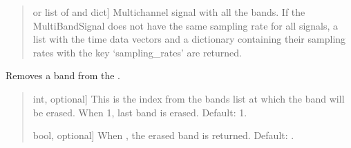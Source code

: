 \documentclass[letterpaper,10pt,english]{sphinxmanual}
\begin{document}
\begin{fulllineitems}
\begin{fulllineitems}
\begin{quote}
\begin{description}
\begin{description}
\end{description}

\begin{description}
\sphinxlineitem{\sphinxstylestrong{sig}}{[} or list of  and dict{]}
\sphinxAtStartPar
Multichannel signal with all the bands. If the MultiBandSignal
does not have the same sampling rate for all signals, a list with
the time data vectors and a dictionary containing their sampling
rates with the key ‘sampling\_rates’ are returned.

\end{description}

\end{description}\end{quote}

\end{fulllineitems}


\begin{fulllineitems}
\label{\detokenize{classes:dsptoolbox.classes.multibandsignal.MultiBandSignal.remove_band}}
\pysigstartsignatures
{}
\pysigstopsignatures
\sphinxAtStartPar
Removes a band from the .
\begin{quote}\begin{description}
\begin{description}
\sphinxlineitem{\sphinxstylestrong{index}}{[}int, optional{]}
\sphinxAtStartPar
This is the index from the bands list at which the band
will be erased. When \sphinxhyphen{}1, last band is erased.
Default: \sphinxhyphen{}1.

\sphinxlineitem{\sphinxstylestrong{return\_band}}{[}bool, optional{]}
\sphinxAtStartPar
When , the erased band is returned. Default: .


\end{description}
\end{description}
\end{quote}
\end{fulllineitems}
\end{fulllineitems}
\end{document}
